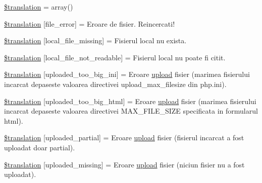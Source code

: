 \begin{DoxyCompactItemize}
\item 
\hyperlink{class_8upload_8ro___r_o_8php_a1f198d410fecc3871ebdd468d343a5e3}{\$translation} = array()
\item 
\hyperlink{class_8upload_8ro___r_o_8php_ac7498e49b9771b04698029aa61c70821}{\$translation} \mbox{[}\textquotesingle{}file\+\_\+error\textquotesingle{}\mbox{]} = \textquotesingle{}Eroare de fisier. Reincercati!\textquotesingle{}
\item 
\hyperlink{class_8upload_8ro___r_o_8php_a6ec3d3a47ab70d77e7aa593e82ead10e}{\$translation} \mbox{[}\textquotesingle{}local\+\_\+file\+\_\+missing\textquotesingle{}\mbox{]} = \textquotesingle{}Fisierul local nu exista.\textquotesingle{}
\item 
\hyperlink{class_8upload_8ro___r_o_8php_a60104befef9b241f3a7a6a755618a4b3}{\$translation} \mbox{[}\textquotesingle{}local\+\_\+file\+\_\+not\+\_\+readable\textquotesingle{}\mbox{]} = \textquotesingle{}Fisierul local nu poate fi citit.\textquotesingle{}
\item 
\hyperlink{class_8upload_8ro___r_o_8php_a6a08dcd0d3651fdd098568f6b2f0a42c}{\$translation} \mbox{[}\textquotesingle{}uploaded\+\_\+too\+\_\+big\+\_\+ini\textquotesingle{}\mbox{]} = \textquotesingle{}Eroare \hyperlink{classupload}{upload} fisier (marimea fisierului incarcat depaseste valoarea directivei upload\+\_\+max\+\_\+filesize din php.\+ini).\textquotesingle{}
\item 
\hyperlink{class_8upload_8ro___r_o_8php_a623d5b8b92169f57d7e43458aa911cbb}{\$translation} \mbox{[}\textquotesingle{}uploaded\+\_\+too\+\_\+big\+\_\+html\textquotesingle{}\mbox{]} = \textquotesingle{}Eroare \hyperlink{classupload}{upload} fisier (marimea fisierului incarcat depaseste valoarea directivei M\+A\+X\+\_\+\+F\+I\+L\+E\+\_\+\+S\+I\+Z\+E specificata in formularul html).\textquotesingle{}
\item 
\hyperlink{class_8upload_8ro___r_o_8php_a967c17da21b0a2d3bd65cca3a9ca0ea8}{\$translation} \mbox{[}\textquotesingle{}uploaded\+\_\+partial\textquotesingle{}\mbox{]} = \textquotesingle{}Eroare \hyperlink{classupload}{upload} fisier (fisierul incarcat a fost uploadat doar partial).\textquotesingle{}
\item 
\hyperlink{class_8upload_8ro___r_o_8php_a0cce433260be65f1f35853a6b4b8952b}{\$translation} \mbox{[}\textquotesingle{}uploaded\+\_\+missing\textquotesingle{}\mbox{]} = \textquotesingle{}Eroare \hyperlink{classupload}{upload} fisier (niciun fisier nu a fost uploadat).\textquotesingle{}

\end{DoxyCompactItemize}
